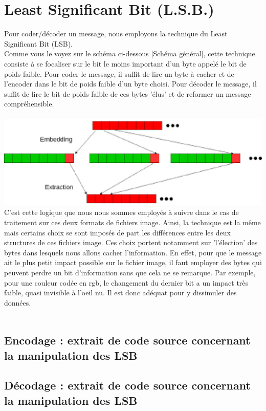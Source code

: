 \newpage
\section{Least Significant Bit (L.S.B.)}
Pour coder/décoder un message, nous employons la technique du Least Significant Bit (LSB). \\
Comme vous le voyez sur le schéma ci-dessous [Schéma général], cette technique consiste à se focaliser sur le bit le moins 
important d'un byte appelé le bit de poids faible.
Pour coder le message, il suffit de lire un byte à cacher et de l'encoder dans le bit de poids faible d'un byte choisi.
Pour décoder le message, il suffit de lire le bit de poids faible de ces bytes 'élus' et de reformer un message compréhensible.\\\\

\includegraphics[width=15cm]{lsb.eps}\\

C'est cette logique que nous nous sommes employés à suivre dans le cas de traitement sur ces deux formats de fichiers image.
Ainsi, la technique est la même mais certains choix se sont imposés de part les différences entre les deux structures de ces 
fichiers image. Ces choix portent notamment sur 'l'élection' des bytes dans lesquels nous allons cacher l'information.
En effet, pour que le message ait le plus petit impact possible sur le fichier image, il faut employer des bytes qui peuvent
perdre un bit d'information sans que cela ne se remarque.
Par exemple, pour une couleur codée en rgb, le changement du dernier bit a un impact très faible, quasi invisible à l'oeil nu.
Il est donc adéquat pour y dissimuler des données.\\\\

\newpage
\subsection{Encodage : extrait de code source concernant la manipulation des LSB}


\subsection{Décodage : extrait de code source concernant la manipulation des LSB}



